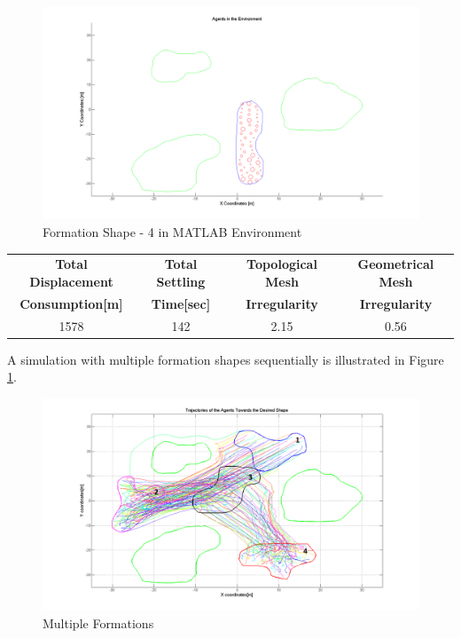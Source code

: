 \begin{figure}[H]
\caption{Formation Shape - 4 in MATLAB Environment}
\centerline{\includegraphics[scale = 0.40]{4}}
\end{figure} 
			
\begin{center}
 \label{perf_shape4} 
\begin{tabular}{||c| c |c |c ||}
\hline
\textbf{Total Displacement }  & \textbf{Total Settling} & \textbf{Topological Mesh} & \textbf{Geometrical Mesh} \\ \textbf{Consumption[m]} & \textbf{Time[sec]}& \textbf{Irregularity} & \textbf{Irregularity} \\
\hline
1578 & 142 &  2.15& 0.56\\
\hline
\end{tabular}
\end{center}
		
A simulation with multiple formation shapes sequentially is illustrated in Figure \ref{multiple_formation_ref}.

\begin{figure}[H]
\caption{Multiple Formations} \label{multiple_formation_ref}
\centerline{\includegraphics[scale = 0.45]{multiple_formation}}
\end{figure} 
		
